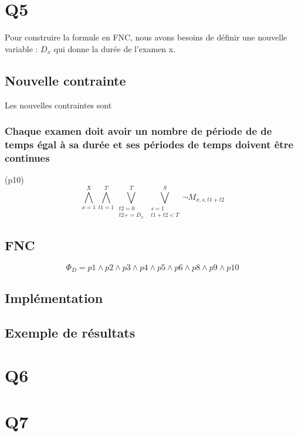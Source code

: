\documentclass[a4paper,11pt]{article}
\begin{document}
\section{Q5}
Pour construire la formule en FNC, nous avons besoins de définir une nouvelle variable :  \( D_{x}\) qui donne la durée de l'examen x.
\subsection{Nouvelle contrainte}
Les nouvelles contraintes sont 
\subsubsection{Chaque examen doit avoir un nombre de période de de temps égal à sa durée et ses périodes de temps doivent être continues}

(p10)
\begin{displaymath}
\bigwedge\limits_{x=1}^{X}\bigwedge\limits_{t1=1}^{T}\bigvee\limits_{\substack{t2=0 \\ t2+= D_{x}}}^{T}\bigvee\limits_{\substack{s=1 \\ t1+t2<T}}^{S} \neg M_{x, s, t1+t2}
\end{displaymath}

\subsection{FNC}

\begin{displaymath}
	\Phi_{D} = p1 \wedge p2 \wedge p3 \wedge p4 \wedge p5 \wedge p6 \wedge p8 \wedge p9 \wedge p10
\end{displaymath}

\subsection{Implémentation}

\subsection{Exemple de résultats}

\section{Q6}

\section{Q7}
\end{document}

